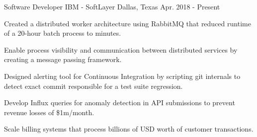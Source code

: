 
\begin{cventries}
	
	\cventry
	{Software Developer}
	{IBM - SoftLayer}
	{Dallas, Texas}
	{Apr. 2018 - Present}
	{
		\begin{cvitems}
			\item {Created a distributed worker architecture using RabbitMQ that reduced runtime of a 20-hour batch process to minutes.}
			\item {Enable process visibility and communication between distributed services by creating a message passing framework.}
			\item {Designed alerting tool for Continuous Integration by scripting git internals to detect exact commit responsible for a test suite regression.}
			\item {Develop Influx queries for anomaly detection in API submissions to prevent revenue losses of \$1m/month.}
			\item {Scale billing systems that process billions of USD worth of customer transactions.}
		\end{cvitems}
	}
	
%	


\end{cventries}
